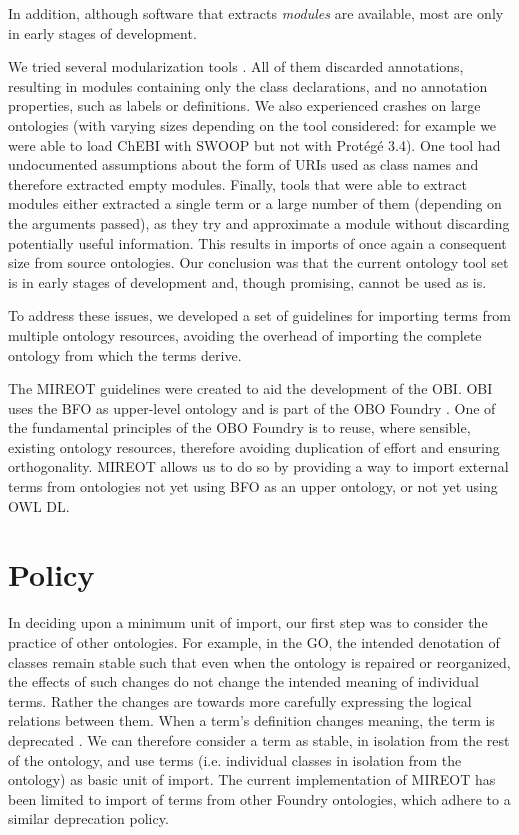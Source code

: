 \documentclass{ao2e}%
\begin{document}
In addition, although software that extracts \emph{modules} are available, most are only in early stages of development.

We tried several modularization tools \cite{Grau2} \cite{Jimenez}  \cite{Seidenberg} \cite{Sirin}. 
All of them discarded annotations, resulting in modules containing only the class declarations, and no annotation properties, such as labels or definitions.
We also experienced crashes on large ontologies (with varying sizes depending on the tool considered: for example we were able to load ChEBI \cite{ChEBI} with SWOOP but not with Prot\'eg\'e 3.4).
One tool %
had undocumented assumptions about the form of URIs used as class names and therefore extracted empty modules. 
Finally, tools %
that were able to extract modules either extracted a single term or a large number of them (depending on the arguments passed), as they try and approximate a module without discarding potentially useful information. This results in imports of once again a consequent size from source ontologies.
Our conclusion was that the current ontology tool set  is in early stages of development and, though promising, cannot be used as is. 

To address these issues, we developed a set of guidelines for importing terms from multiple ontology resources, avoiding the overhead of importing the complete ontology from which the terms derive. 

The \ac{MIREOT} guidelines were created to aid the development of the \ac{OBI}.
\ac{OBI} uses the \ac{BFO} \cite{BFO} as upper-level ontology and is part of the \ac{OBO} Foundry \cite{OBOFoundry}. 
One of the fundamental principles of the \ac{OBO} Foundry is to reuse, where sensible, existing ontology resources, therefore avoiding duplication of effort and ensuring orthogonality.
\ac{MIREOT} allows us to do so by providing a way to import external terms from ontologies not yet using \ac{BFO} as an upper ontology, or not yet using OWL DL.

\section{Policy}

In deciding upon a minimum unit of import, our first step was to consider the practice of other ontologies.
For example, in the \ac{GO}, the intended denotation of classes remain stable such that even when the ontology is repaired or reorganized, the effects of such changes do not change the intended meaning of individual terms.
Rather the changes are towards more carefully expressing the logical relations between them.
When a term's definition changes meaning, the term is deprecated \cite{GOGuide}.
We can therefore consider a term as stable, in isolation from the rest of the ontology, and use terms (i.e. individual classes in isolation from the ontology) as basic unit of import.
The current implementation of \ac{MIREOT} has been limited to import of terms from other Foundry ontologies, which adhere to a similar deprecation policy.
\end{document}
